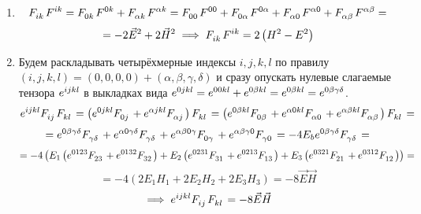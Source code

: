 \documentclass{article}
\begin{document}
\begin{enumerate}
    \item 
        \begin{equation*}
        \tensor{F}{_i_k}\tensor{F}{^i^k}=\tensor{F}{_0_k}\tensor{F}{^0^k}+\tensor{F}{_\alpha_k}\tensor{F}{^\alpha^k}=\tensor{F}{_0_0}\tensor{F}{^0^0}+\tensor{F}{_0_\alpha}\tensor{F}{^0^\alpha}+\tensor{F}{_\alpha_0}\tensor{F}{^\alpha^0}+\tensor{F}{_\alpha_\beta}\tensor{F}{^\alpha^\beta}=
        \end{equation*}
        \begin{equation*}
        =-2\vec{E}^2+2\vec{H}^2 \implies \tensor{F}{_i_k}\tensor{F}{^i^k}=2\left(H^2-E^2\right)
        \end{equation*}
    \item
    Будем раскладывать четырёхмерные индексы $i,j,k,l$ по правилу $\left(i,j,k,l\right)=\left(0,0,0,0\right)+\left(\alpha,\beta,\gamma,\delta\right)$ и сразу опускать нулевые слагаемые тензора $\tensor{e}{^i^j^k^l}$ в выкладках вида $\tensor{e}{^0^j^k^l}=\tensor{e}{^0^0^k^l}+\tensor{e}{^0^\beta^k^l}=\tensor{e}{^0^\beta^k^l}=\tensor{e}{^0^\beta^\gamma^\delta}$.
        \begin{equation*}
            \tensor{e}{^i^j^k^l}\tensor{F}{_i_j}\tensor{F}{_k_l}=\left(\tensor{e}{^0^j^k^l}\tensor{F}{_0_j}+\tensor{e}{^\alpha^j^k^l}\tensor{F}{_\alpha_j}\right)\tensor{F}{_k_l}=\left(\tensor{e}{^0^\beta^k^l}\tensor{F}{_0_\beta}+\tensor{e}{^\alpha^0^k^l}\tensor{F}{_\alpha_0}+\tensor{e}{^\alpha^\beta^k^l}\tensor{F}{_\alpha_\beta}\right)\tensor{F}{_k_l}=
        \end{equation*}
        \begin{equation*}
            =\tensor{e}{^0^\beta^\gamma^\delta}\tensor{F}{_\gamma_\delta}+\tensor{e}{^\alpha^0^\gamma^\delta}\tensor{F}{_\gamma_\delta}+\tensor{e}{^\alpha^\beta^0^\gamma}\tensor{F}{_0_\gamma}+\tensor{e}{^\alpha^\beta^\gamma^0}\tensor{F}{_\gamma_0}=-4E_b\tensor{e}{^0^\beta^\gamma^\delta}\tensor{F}{_\gamma_\delta}=
        \end{equation*}
        \begin{equation*}
            =-4\left(E_1\left(\tensor{e}{^0^1^2^3}\tensor{F}{_2_3}+\tensor{e}{^0^1^3^2}\tensor{F}{_3_2}\right)+E_2\left(\tensor{e}{^0^2^3^1}\tensor{F}{_3_1}+\tensor{e}{^0^2^1^3}\tensor{F}{_1_3}\right)+E_3\left(\tensor{e}{^0^3^2^1}\tensor{F}{_2_1}+\tensor{e}{^0^3^1^2}\tensor{F}{_1_2}\right)\right)=
        \end{equation*}
        \begin{equation*}
            =-4\left(2E_1H_1+2E_2H_2+2E_3H_3\right)=-8\vec{E}\vec{H}
        \end{equation*}
        \begin{equation*}
            \implies \tensor{e}{^i^j^k^l}\tensor{F}{_i_j}\tensor{F}{_k_l}=-8\vec{E}\vec{H}
        \end{equation*}
\end{enumerate}
\end{document}
